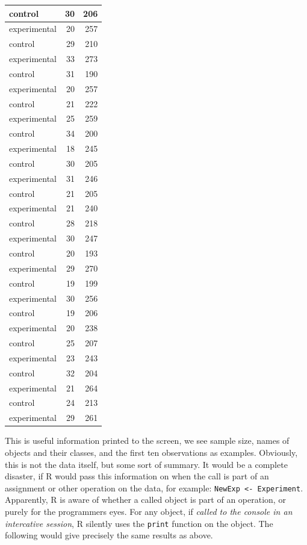 \documentclass[]{svmono}
\theoremstyle{definition}
\theoremstyle{definition}
\theoremstyle{definition}
\theoremstyle{remark}
\begin{document}
\begin{tabular}{l|r|r}
\hline
control & 30 & 206\\
\hline
experimental & 20 & 257\\
\hline
control & 29 & 210\\
\hline
experimental & 33 & 273\\
\hline
control & 31 & 190\\
\hline
experimental & 20 & 257\\
\hline
control & 21 & 222\\
\hline
experimental & 25 & 259\\
\hline
control & 34 & 200\\
\hline
experimental & 18 & 245\\
\hline
control & 30 & 205\\
\hline
experimental & 31 & 246\\
\hline
control & 21 & 205\\
\hline
experimental & 21 & 240\\
\hline
control & 28 & 218\\
\hline
experimental & 30 & 247\\
\hline
control & 20 & 193\\
\hline
experimental & 29 & 270\\
\hline
control & 19 & 199\\
\hline
experimental & 30 & 256\\
\hline
control & 19 & 206\\
\hline
experimental & 20 & 238\\
\hline
control & 25 & 207\\
\hline
experimental & 23 & 243\\
\hline
control & 32 & 204\\
\hline
experimental & 21 & 264\\
\hline
control & 24 & 213\\
\hline
experimental & 29 & 261\\
\hline
\end{tabular}

This is useful information printed to the screen, we see sample size,
names of objects and their classes, and the first ten observations as
examples. Obviously, this is not the data itself, but some sort of
summary. It would be a complete disaster, if R would pass this
information on when the call is part of an assignment or other operation
on the data, for example: \texttt{NewExp\ \textless{}-\ Experiment}.
Apparently, R is aware of whether a called object is part of an
operation, or purely for the programmers eyes. For any object, if
\emph{called to the console in an intercative session}, R silently uses
the \texttt{print} function on the object. The following would give
precisely the same results as above.
\end{document}
